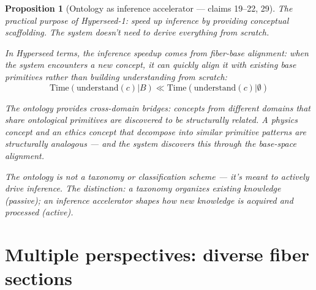 \documentclass[11pt,a4paper]{article}
\newtheorem{proposition}[definition]{Proposition}
\begin{document}
\begin{proposition}[Ontology as inference accelerator --- claims 19--22, 29]
\label{prop:acceleration}
The practical purpose of Hyperseed-1: speed up inference by providing
conceptual scaffolding. The system doesn't need to derive everything
from scratch.

In Hyperseed terms, the inference speedup comes from \emph{fiber-base
alignment}: when the system encounters a new concept, it can quickly
align it with existing base primitives rather than building understanding
from scratch:
\[
  \text{Time}(\text{understand}(c) | B) \ll
  \text{Time}(\text{understand}(c) | \emptyset)
\]

The ontology provides cross-domain bridges: concepts from different
domains that share ontological primitives are discovered to be
structurally related. A physics concept and an ethics concept that
decompose into similar primitive patterns are structurally analogous
--- and the system discovers this through the base-space alignment.

The ontology is not a taxonomy or classification scheme --- it's meant
to actively drive inference. The distinction: a taxonomy organizes
existing knowledge (passive); an inference accelerator shapes how new
knowledge is acquired and processed (active).
\end{proposition}

\section{Multiple perspectives: diverse fiber sections}
\label{sec:perspectives}
\end{document}
